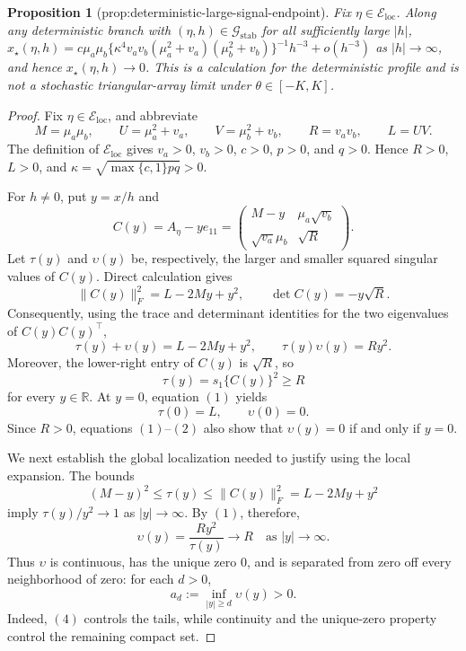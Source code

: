 \documentclass{article}
\newtheorem{proposition}{Proposition}
\begin{document}
\begin{proposition}[prop:deterministic-large-signal-endpoint]\label{prop:deterministic-large-signal-endpoint}
Fix \(\eta\in\mathcal E_{\mathrm{loc}}\). Along any deterministic branch with \((\eta,h)\in\mathcal G_{\mathrm{stab}}\) for all sufficiently large \(|h|\), \(x_\star(\eta,h)=c\mu_a\mu_b\{\kappa^4v_av_b(\mu_a^2+v_a)(\mu_b^2+v_b)\}^{-1}h^{-3}+o(h^{-3})\) as \(|h|\to\infty\), and hence \(x_\star(\eta,h)\to0\). This is a calculation for the deterministic profile and is not a stochastic triangular-array limit under \(\theta\in[-K,K]\).
\end{proposition}
\begin{proof}
Fix \(\eta\in\mathcal E_{\mathrm{loc}}\), and abbreviate
\[
 M=\mu_a\mu_b,\qquad U=\mu_a^2+v_a,\qquad V=\mu_b^2+v_b,\qquad R=v_av_b,\qquad L=UV.
\]
The definition of \(\mathcal E_{\mathrm{loc}}\) gives \(v_a>0\), \(v_b>0\), \(c>0\), \(p>0\), and \(q>0\).  Hence \(R>0\), \(L>0\), and \(\kappa=\sqrt{\max\{c,1\}pq}>0\).

For \(h\ne0\), put \(y=x/h\) and
\[
 C(y)=A_\eta-ye_{11}
 =\begin{pmatrix}
 M-y&\mu_a\sqrt{v_b}\\
 \sqrt{v_a}\mu_b&\sqrt{R}
 \end{pmatrix}.
\]
Let \(\tau(y)\) and \(\upsilon(y)\) be, respectively, the larger and smaller squared singular values of \(C(y)\).  Direct calculation gives
\[
 \|C(y)\|_F^2=L-2My+y^2,
 \qquad
 \det C(y)=-y\sqrt R.
\]
Consequently, using the trace and determinant identities for the two eigenvalues of \(C(y)C(y)^{\top}\),
\[
 \tau(y)+\upsilon(y)=L-2My+y^2,
 \qquad
 \tau(y)\upsilon(y)=Ry^2.                                      \tag{1}
\]
Moreover, the lower-right entry of \(C(y)\) is \(\sqrt R\), so
\[
 \tau(y)=s_1\{C(y)\}^2\ge R                                      \tag{2}
\]
for every \(y\in\mathbb R\).  At \(y=0\), equation \((1)\) yields
\[
 \tau(0)=L,\qquad \upsilon(0)=0.                                  \tag{3}
\]
Since \(R>0\), equations \((1)\)--\((2)\) also show that \(\upsilon(y)=0\) if and only if \(y=0\).

We next establish the global localization needed to justify using the local expansion.  The bounds
\[
 (M-y)^2\le \tau(y)\le \|C(y)\|_F^2=L-2My+y^2
\]
imply \(\tau(y)/y^2\to1\) as \(|y|\to\infty\).  By \((1)\), therefore,
\[
 \upsilon(y)=\frac{Ry^2}{\tau(y)}\longrightarrow R
 \quad\text{as }|y|\to\infty.                                    \tag{4}
\]
Thus \(\upsilon\) is continuous, has the unique zero \(0\), and is separated from zero off every neighborhood of zero: for each \(d>0\),
\[
 a_d:=\inf_{|y|\ge d}\upsilon(y)>0.                                \tag{5}
\]
Indeed, \((4)\) controls the tails, while continuity and the unique-zero property control the remaining compact set.


\end{proof}
\end{document}
